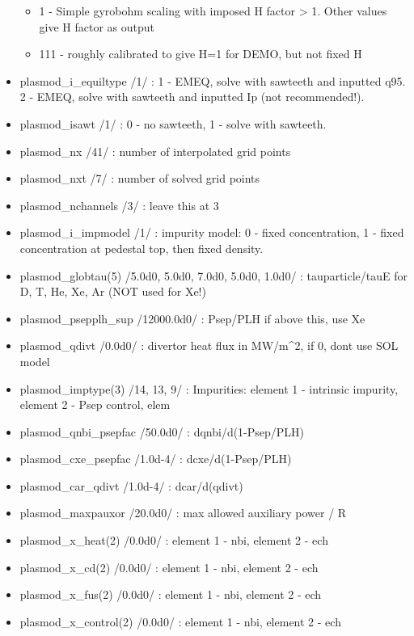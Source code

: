 \documentclass[]{article}
\begin{document}
\begin{itemize}
  \begin{itemize}
  \itemsep1pt\parskip0pt
  \item
    1 - Simple gyrobohm scaling with imposed H factor \textgreater{} 1.
    Other values give H factor as output
  \item
    111 - roughly calibrated to give H=1 for DEMO, but not fixed H
  \end{itemize}
\item
  plasmod\_i\_equiltype /1/ : 1 - EMEQ, solve with sawteeth and inputted
  q95. 2 - EMEQ, solve with sawteeth and inputted Ip (not recommended!).
\item
  plasmod\_isawt /1/ : 0 - no sawteeth, 1 - solve with sawteeth.
\item
  plasmod\_nx /41/ : number of interpolated grid points
\item
  plasmod\_nxt /7/ : number of solved grid points
\item
  plasmod\_nchannels /3/ : leave this at 3
\item
  plasmod\_i\_impmodel /1/ : impurity model: 0 - fixed concentration, 1
  - fixed concentration at pedestal top, then fixed density.
\item
  plasmod\_globtau(5) /5.0d0, 5.0d0, 7.0d0, 5.0d0, 1.0d0/ :
  tauparticle/tauE for D, T, He, Xe, Ar (NOT used for Xe!)
\item
  plasmod\_psepplh\_sup /12000.0d0/ : Psep/PLH if above this, use Xe
\item
  plasmod\_qdivt /0.0d0/ : divertor heat flux in MW/m\^{}2, if 0, dont
  use SOL model
\item
  plasmod\_imptype(3) /14, 13, 9/ : Impurities: element 1 - intrinsic
  impurity, element 2 - Psep control, elem
\item
  plasmod\_qnbi\_psepfac /50.0d0/ : dqnbi/d(1-Psep/PLH)
\item
  plasmod\_cxe\_psepfac /1.0d-4/ : dcxe/d(1-Psep/PLH)
\item
  plasmod\_car\_qdivt /1.0d-4/ : dcar/d(qdivt)
\item
  plasmod\_maxpauxor /20.0d0/ : max allowed auxiliary power / R
\item
  plasmod\_x\_heat(2) /0.0d0/ : element 1 - nbi, element 2 - ech
\item
  plasmod\_x\_cd(2) /0.0d0/ : element 1 - nbi, element 2 - ech
\item
  plasmod\_x\_fus(2) /0.0d0/ : element 1 - nbi, element 2 - ech
\item
  plasmod\_x\_control(2) /0.0d0/ : element 1 - nbi, element 2 - ech

\end{itemize}
\end{document}
